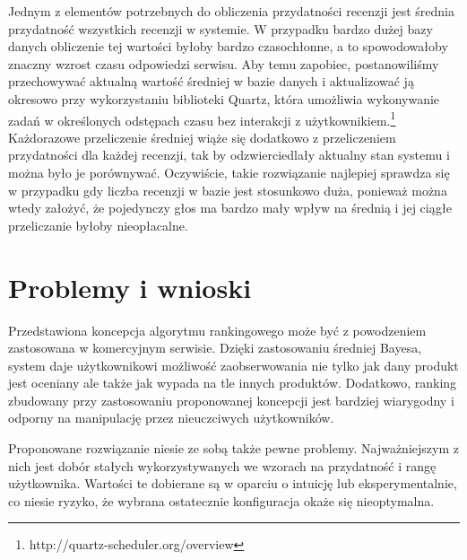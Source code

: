 Jednym z elementów potrzebnych do obliczenia przydatności recenzji jest średnia przydatność wszystkich recenzji w systemie. W przypadku bardzo dużej bazy danych obliczenie tej wartości byłoby bardzo czasochłonne, a to spowodowałoby znaczny wzrost czasu odpowiedzi serwisu. Aby temu zapobiec, postanowiliśmy przechowywać aktualną wartość średniej w bazie danych i aktualizować ją okresowo przy wykorzystaniu biblioteki Quartz, która umożliwia wykonywanie zadań w określonych odstępach czasu bez interakcji z użytkownikiem.\footnote{http://quartz-scheduler.org/overview} Każdorazowe przeliczenie średniej wiąże się dodatkowo z przeliczeniem przydatności dla każdej recenzji, tak by odzwierciedlały aktualny stan systemu i można było je porównywać. Oczywiście, takie rozwiązanie najlepiej sprawdza się w przypadku gdy liczba  recenzji w bazie jest stosunkowo duża, ponieważ można wtedy założyć, że pojedynczy głos ma bardzo mały wpływ na średnią i jej ciągłe przeliczanie byłoby nieopłacalne.

\section{Problemy i wnioski}

Przedstawiona koncepcja algorytmu rankingowego może być z powodzeniem zastosowana w komercyjnym serwisie. Dzięki zastosowaniu średniej Bayesa, system daje użytkownikowi możliwość zaobserwowania nie tylko jak dany produkt jest oceniany ale także jak wypada na tle innych produktów. Dodatkowo, ranking zbudowany przy zastosowaniu proponowanej koncepcji jest bardziej wiarygodny i odporny na manipulację przez nieuczciwych użytkowników.

Proponowane rozwiązanie niesie ze sobą także pewne problemy. Najważniejszym z nich jest dobór stałych wykorzystywanych we wzorach na przydatność i rangę użytkownika. Wartości te dobierane są w oparciu o intuicję lub eksperymentalnie, co niesie ryzyko, że wybrana ostatecznie konfiguracja okaże się nieoptymalna.
